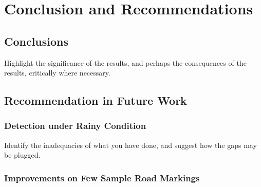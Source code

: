
\chapter{Conclusion and Recommendations}
\label{cha:conclusion}
\begin{spacing}{1.5}
\setlength{\parskip}{0.3in}

\section{Conclusions}

Highlight the significance of the results, and perhaps the consequences of the results, critically where necessary.

\section{Recommendation in Future Work}

\subsection{Detection under Rainy Condition}

Identify the inadequacies of what you have done, and suggest how the gaps may be plugged.

\subsection{Improvements on Few Sample Road Markings}


\end{spacing}
\newpage
